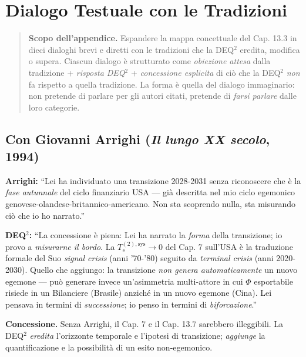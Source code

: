 \chapter{Dialogo Testuale con le
Tradizioni}\label{dialogo-testuale-con-le-tradizioni}

\begin{quote}
\textbf{Scopo dell'appendice.} Espandere la mappa concettuale del Cap.
13.3 in dieci dialoghi brevi e diretti con le tradizioni che la DEQ$^2$
eredita, modifica o supera. Ciascun dialogo è strutturato come
\emph{obiezione attesa} dalla tradizione + \emph{risposta DEQ$^2$} +
\emph{concessione esplicita} di ciò che la DEQ$^2$ \emph{non} fa rispetto a
quella tradizione. La forma è quella del dialogo immaginario: non
pretende di parlare per gli autori citati, pretende di \emph{farsi
parlare} dalle loro categorie.
\end{quote}



\section{\texorpdfstring{Con Giovanni Arrighi (\emph{Il lungo XX
secolo},
1994)}{Con Giovanni Arrighi (Il lungo XX secolo, 1994)}}\label{con-giovanni-arrighi-il-lungo-xx-secolo-1994}

\textbf{Arrighi:} ``Lei ha individuato una transizione 2028-2031 senza
riconoscere che è la \emph{fase autunnale} del ciclo finanziario USA ---
già descritta nel mio ciclo egemonico
genovese-olandese-britannico-americano. Non sta scoprendo nulla, sta
misurando ciò che io ho narrato.''

\textbf{DEQ$^2$:} ``La concessione è piena: Lei ha narrato la \emph{forma}
della transizione; io provo a \emph{misurarne il bordo}. La
\(T_s^{(2),\text{sys}} \to 0\) del Cap. 7 sull'USA è la traduzione
formale del Suo \emph{signal crisis} (anni '70-'80) seguito da
\emph{terminal crisis} (anni 2020-2030). Quello che aggiungo: la
transizione \emph{non genera automaticamente} un nuovo egemone --- può
generare invece un'asimmetria multi-attore in cui \(\Phi\) esportabile
risiede in un Bilanciere (Brasile) anziché in un nuovo egemone (Cina).
Lei pensava in termini di \emph{successione}; io penso in termini di
\emph{biforcazione}.''

\textbf{Concessione.} Senza Arrighi, il Cap. 7 e il Cap. 13.7 sarebbero
illeggibili. La DEQ$^2$ \emph{eredita} l'orizzonte temporale e l'ipotesi di
transizione; \emph{aggiunge} la quantificazione e la possibilità di un
esito non-egemonico.



